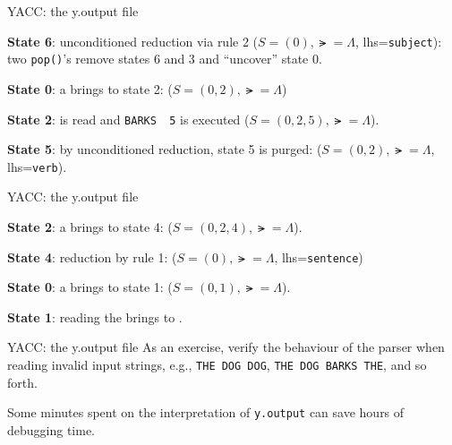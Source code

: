 \begin{frame}[fragile]{YACC: the y.output file}

{\bf State 6}: unconditioned reduction via rule 2
($S=(0),\lat=\Lambda$, lhs={\tt subject}):
two {\tt pop()}'s remove states 6 and 3 and ``uncover'' state 0.


\vspace{20pt}

{\bf State 0}: a \goto{} brings to state 2:
($S=(0,2), \lat=\Lambda$)


\vspace{20pt}

{\bf State 2}: \lat{} is read and
{\tt BARKS \shift\ 5} is executed
($S=(0,2,5), \lat=\Lambda$).


\vspace{20pt}

{\bf State 5}: by unconditioned reduction, state 5 is purged:
($S=(0,2),\lat=\Lambda$, lhs={\tt verb}).

\end{frame}
\begin{frame}[fragile]{YACC: the y.output file}

{\bf State 2}: a \goto{} brings to 
state 4: ($S=(0,2,4), \lat=\Lambda$).


\vspace{20pt}

{\bf State 4}: reduction by rule 1:
($S=(0),\lat=\Lambda$, lhs={\tt sentence})


\vspace{20pt}

{\bf State 0}: a \goto{}  brings to state 1:
($S=(0,1), \lat=\Lambda$).


\vspace{20pt}

{\bf State 1}: reading the \endmarker{} brings to \accept.



\end{frame}
\begin{frame}[fragile]{YACC: the y.output file}
As an exercise, verify the behaviour of the parser
when reading invalid input strings, e.g.,
{\tt THE DOG DOG}, {\tt THE DOG BARKS THE}, and so forth.


\vspace{20pt}

Some minutes spent on the interpretation of
{\tt y.output} can save hours of debugging time.


\end{frame}
